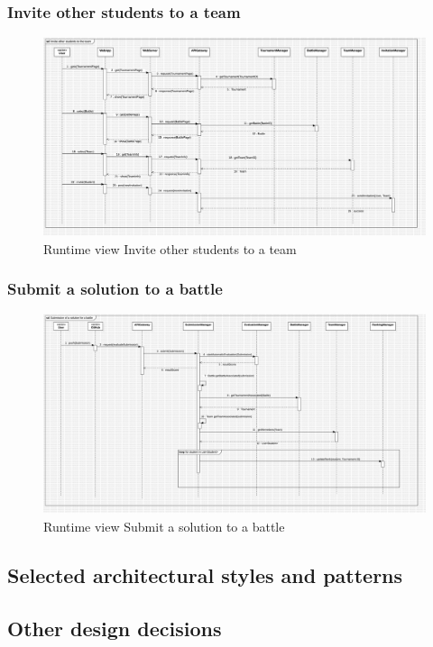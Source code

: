\subsubsection*{Invite other students to a team}
\begin{figure}[H]
    \centering
    \includegraphics[width=\textwidth]{Diagrams/InviteStudentSD.jpg}
    \caption{Runtime view Invite other students to a team}
    \label{fig:runtime_view_invite_student}
\end{figure}

\subsubsection*{Submit a solution to a battle}
\begin{figure}[H]
    \centering
    \includegraphics[width=\textwidth]{Diagrams/SolutionSubmissionSD.jpg}
    \caption{Runtime view Submit a solution to a battle}
    \label{fig:runtime_view_submit_solution}
\end{figure}
\clearpage
\subsection{Selected architectural styles and patterns}
\subsection{Other design decisions}
